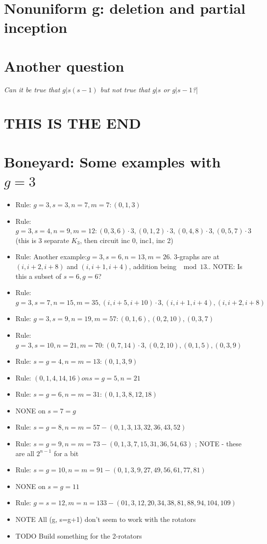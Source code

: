 \documentclass[11pt, oneside]{article} 	%
\begin{document}
\section{Nonuniform g: deletion and partial inception}



\section{Another question}

\emph{Can it be true that $g | s(s-1)$ but not true that $g | s$ or $g | s-1$?}|


\section{THIS IS THE END}



\section{Boneyard: Some examples with $g=3$}


\begin{itemize}

\item Rule: $g=3, s=3, n=7, m=7: (0,1,3)$
\item Rule: $g=3, s=4, n = 9, m = 12: (0,3,6) \cdot 3, (0,1,2) \cdot 3, (0,4,8) \cdot 3, (0, 5,7) \cdot 3$ (this is 3 separate $K_3$, then circuit inc 0, inc1, inc 2)
\item Rule: Another example:$ g=3, s=6, n=13, m=26$. 3-graphs are at $(i, i+2, i+8)$ and $(i, i+1, i+4)$, addition being $\mod 13$.. NOTE: Is this a subset of $s=6, g=6$?
\item Rule: $g=3, s=7, n=15, m=35, (i, i+5, i+10) \cdot 3, (i, i+1, i+4), (i, i+2, i+8)$
\item Rule: $g=3, s=9, n=19, m=57: (0,1,6), (0,2,10), (0,3,7)$
\item Rule: $g=3, s=10, n=21, m=70: (0,7,14) \cdot 3, (0,2,10), (0,1,5), (0,3,9)$
\item Rule: $s=g=4, n=m=13: (0, 1, 3, 9)$
\item Rule: $(0,1,4,14,16) on s=g=5, n=21$
\item Rule: $s=g=6, n=m=31: (0, 1, 3, 8, 12, 18)$
\item NONE on $s=7=g$
\item Rule: $s=g=8, n=m=57 - (0,1, 3, 13, 32, 36, 43, 52)$
\item Rule: $s=g=9, n=m=73 - (0,1, 3, 7, 15, 31, 36, 54, 63)$ ; NOTE - these are all $2^{n-1}$ for a bit	
\item Rule: $s=g=10, n=m=91 - (0, 1, 3, 9, 27, 49, 56, 61, 77, 81)$
\item NONE on $s=g=11$
\item Rule: $g=s=12, m=n=133 - (0 1, 3, 12, 20, 34, 38, 81, 88, 94, 104, 109)$
\item NOTE All (g, s=g+1) don't seem to work with the rotators
\item TODO Build something for the 2-rotators
\end{itemize}
\end{document}
